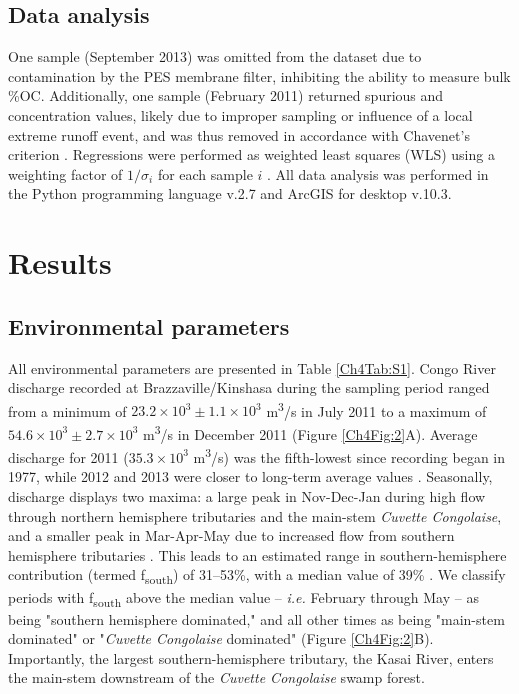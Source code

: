 \subsection{Data analysis}

One sample (September 2013) was omitted from the dataset due to contamination by the PES membrane filter, inhibiting the ability to measure bulk \%OC. Additionally, one sample (February 2011) returned spurious  and concentration values, likely due to improper sampling or influence of a local extreme runoff event, and was thus removed in accordance with Chavenet's criterion \citep{Glover:2011tl}. Regressions were performed as weighted least squares (WLS) using a weighting factor of $1/\sigma_i$ for each sample $i$ \citep{Glover:2011tl}. All data analysis was performed in the Python programming language v.2.7 and ArcGIS for desktop v.10.3.

\section{Results}

\subsection{Environmental parameters}

All environmental parameters are presented in Table \ref{Ch4Tab:S1}. Congo River discharge recorded at Brazzaville/Kinshasa during the sampling period ranged from a minimum of $23.2 \times 10^3 \pm 1.1 \times 10^3$ m\textsuperscript{3}/s in July 2011 to a maximum of $54.6 \times 10^3 \pm 2.7 \times 10^3$ m\textsuperscript{3}/s in December 2011 (Figure \ref{Ch4Fig:2}A). Average discharge for 2011 ($35.3 \times 10^3$ m\textsuperscript{3}/s) was the fifth-lowest since recording began in 1977, while 2012 and 2013 were closer to long-term average values \citep{Spencer:2012en}. Seasonally, discharge displays two maxima: a large peak in Nov-Dec-Jan during high flow through northern hemisphere tributaries and the main-stem \textit{Cuvette Congolaise}, and a smaller peak in Mar-Apr-May due to increased flow from southern hemisphere tributaries \citep{Bricquet:1993ve,Coynel:2005cn,Bouillon:2012cw,Spencer:2012en,Spencer:2014vp}. This leads to an estimated range in southern-hemisphere contribution (termed f\textsubscript{south}) of 31--53\%, with a median value of 39\% \citep{Bricquet:1993ve}. We classify periods with f\textsubscript{south} above the median value -- \textit{\textit{i.e.}} February through May -- as being "southern hemisphere dominated," and all other times as being "main-stem dominated" or "\textit{Cuvette Congolaise} dominated" (Figure \ref{Ch4Fig:2}B). Importantly, the largest southern-hemisphere tributary, the Kasai River, enters the main-stem downstream of the \textit{Cuvette Congolaise} swamp forest.

